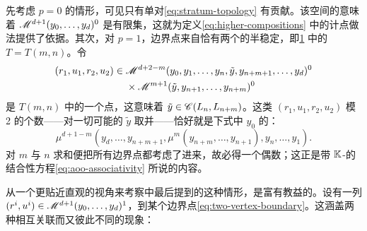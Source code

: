 先考虑 $p=0$ 的情形，可见只有单\trVertex{}\trTree{}对\eqref{eq:stratum-topology} 有贡献。该空间的\trCompactness{}意味着 $\mathscr{M}^{d+1}(y_0,\ldots,y_d)^0$ 是有限集，这就为定义\eqref{eq:higher-compositions} 中的计点做法提供了依据。其次，对 $p=1$，边界点来自恰有两个\trVertex{}的半稳定\trTree，即\cref{fig:two-vertex-tree} 中的 $T=T(m,n)$。令
\begin{equation}\label{eq:two-vertex-boundary}
\begin{aligned}
(r_1,u_1,r_2,u_2)\in{}&\mathscr{M}^{d+2-m}(y_0,y_1,\ldots,y_n,\tilde{y},y_{n+m+1},\ldots,y_d)^0\\
&\times\mathscr{M}^{m+1}(\tilde{y},y_{n+1},\ldots,y_{n+m})^0
\end{aligned}
\end{equation}
是 $T(m,n)$ \trStratum{}中的一个点，这意味着 $\tilde{y}\in\mathscr{C}(L_n,L_{n+m})$。这类 $(r_1,u_1,r_2,u_2)$ 模 2 的个数——对一切可能的 $\tilde{y}$ 取并——恰好就是下式中 $y_0$ 的\trCoefficients：
\begin{equation*}
\mu^{d+1-m}(y_d,\ldots,y_{n+m+1},\mu^m(y_{n+m},\ldots,y_{n+1}),y_n,\ldots,y_1).
\end{equation*}
对 $m$ 与 $n$ 求和便把所有边界点都考虑了进来，故必得一个偶数；这正是带 $\mathbb{K}$-\trCoefficients{}的\trAinfty{}结合性方程\eqref{eq:aoo-associativity} 所说的内容。
\begin{figure}[htbp]
\centering
{}
\caption{}\label{fig:two-vertex-tree}
\end{figure}
从一个更贴近直观的视角来考察\trGromov\trCompactification{}中最后提到的这种情形，是富有教益的。设有一列 $(r^i,u^i)\in\mathscr{M}^{d+1}(y_0,\ldots,y_d)^1$，\trConvergence{}到某个边界点\eqref{eq:two-vertex-boundary}。这涵盖两种相互关联而又彼此不同的现象：
